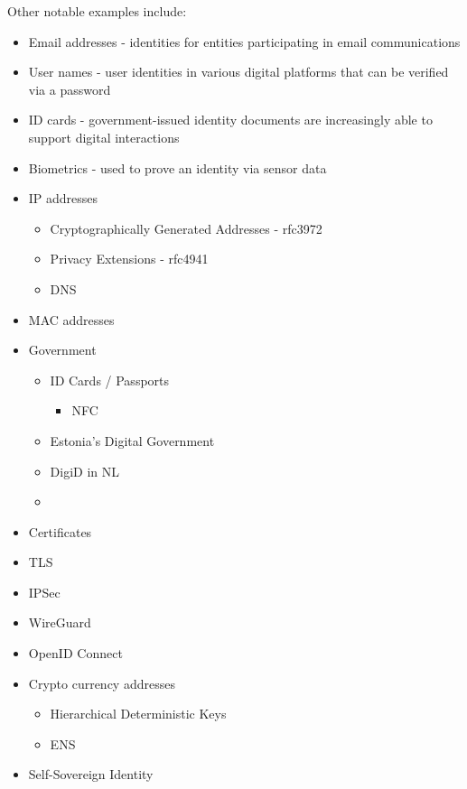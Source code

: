 Other notable examples include:

\begin{itemize}
\tightlist
\item
  Email addresses - identities for entities participating in email communications
\item
  User names - user identities in various digital platforms that can be verified via a password
\item
  ID cards - government-issued identity documents are increasingly able to support digital interactions
\item
  Biometrics - used to prove an identity via sensor data
\end{itemize}

\begin{itemize}
\tightlist
\item
  IP addresses

  \begin{itemize}
  \tightlist
  \item
    Cryptographically Generated Addresses - rfc3972
  \item
    Privacy Extensions - rfc4941
  \item
    DNS
  \end{itemize}
\item
  MAC addresses
\item
  Government

  \begin{itemize}
  \tightlist
  \item
    ID Cards / Passports

    \begin{itemize}
    \tightlist
    \item
      NFC
    \end{itemize}
  \item
    Estonia's Digital Government
  \item
    DigiD in NL
  \item
  \end{itemize}
\item
  Certificates
\item
  TLS
\item
  IPSec
\item
  WireGuard
\item
  OpenID Connect
\item
  Crypto currency addresses

  \begin{itemize}
  \tightlist
  \item
    Hierarchical Deterministic Keys
  \item
    ENS
  \end{itemize}
\item
  Self-Sovereign Identity


\end{itemize}
